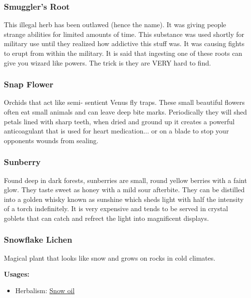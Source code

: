 \subsubsection{Smuggler's Root}
\label{smugglers_root}

This illegal herb has been outlawed (hence the name). It was giving people strange abilities for limited amounts of time. This substance was used shortly for military use until they realized how addictive this stuff was. It was causing fights to erupt from within the military. It is said that ingesting one of these roots can give you wizard like powers. The trick is they are VERY hard to find.

\subsubsection{Snap Flower}
\label{snap_flower}

Orchids that act like semi- sentient Venus fly traps. These small beautiful flowers often eat small animals and can leave deep bite marks. Periodically they will shed petals lined with sharp teeth, when dried and ground up it creates a powerful anticoagulant that is used for heart medication... or on a blade to stop your opponents wounds from sealing.

\subsubsection{Sunberry}
\label{sunberry}

Found deep in dark forests, sunberries are small, round yellow berries with a faint glow. They taste sweet as honey with a mild sour afterbite. They can be distilled into a golden whisky known as sunshine which sheds light with half the intensity of a torch indefinitely. It is very expensive and tends to be served in crystal goblets that can catch and refrect the light into magnificent displays.

\subsubsection{Snowflake Lichen}
\label{Snowflake Lichen}

Magical plant that looks like snow and grows on rocks in cold climates.

\vspace{5mm}

\textbf{Usages:}

\begin{itemize}[noitemsep]
\item[] Herbalism: \hyperref[Snow oil]{Snow oil}
\end{itemize}

